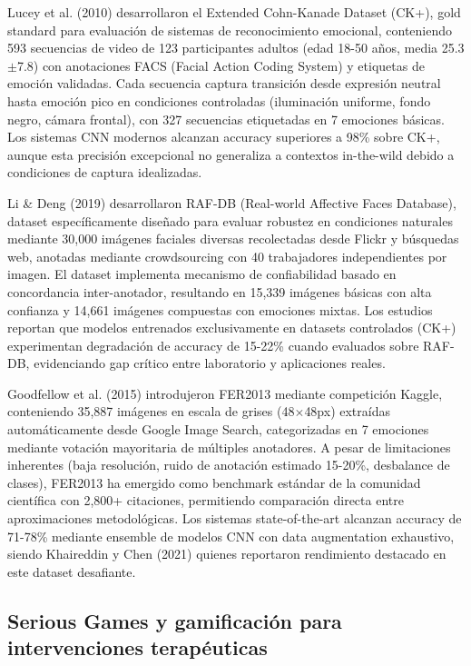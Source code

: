 \documentclass[journal,article,submit,pdftex,moreauthors]{Definitions/mdpi}
\begin{document}
	Lucey et al. (2010) \cite{ref14} desarrollaron el Extended Cohn-Kanade Dataset (CK+), gold standard para evaluación de sistemas de reconocimiento emocional, conteniendo 593 secuencias de video de 123 participantes adultos (edad 18-50 años, media 25.3$\pm$7.8) con anotaciones FACS (Facial Action Coding System) y etiquetas de emoción validadas. Cada secuencia captura transición desde expresión neutral hasta emoción pico en condiciones controladas (iluminación uniforme, fondo negro, cámara frontal), con 327 secuencias etiquetadas en 7 emociones básicas. Los sistemas CNN modernos alcanzan accuracy superiores a 98\% sobre CK+, aunque esta precisión excepcional no generaliza a contextos in-the-wild debido a condiciones de captura idealizadas.
	
	Li \& Deng (2019) \cite{ref15} desarrollaron RAF-DB (Real-world Affective Faces Database), dataset específicamente diseñado para evaluar robustez en condiciones naturales mediante 30,000 imágenes faciales diversas recolectadas desde Flickr y búsquedas web, anotadas mediante crowdsourcing con 40 trabajadores independientes por imagen. El dataset implementa mecanismo de confiabilidad basado en concordancia inter-anotador, resultando en 15,339 imágenes básicas con alta confianza y 14,661 imágenes compuestas con emociones mixtas. Los estudios reportan que modelos entrenados exclusivamente en datasets controlados (CK+) experimentan degradación de accuracy de 15-22\% cuando evaluados sobre RAF-DB, evidenciando gap crítico entre laboratorio y aplicaciones reales.
	
	Goodfellow et al. (2015) \cite{ref16} introdujeron FER2013 mediante competición Kaggle, conteniendo 35,887 imágenes en escala de grises (48$\times$48px) extraídas automáticamente desde Google Image Search, categorizadas en 7 emociones mediante votación mayoritaria de múltiples anotadores. A pesar de limitaciones inherentes (baja resolución, ruido de anotación estimado 15-20\%, desbalance de clases), FER2013 ha emergido como benchmark estándar de la comunidad científica con 2,800+ citaciones, permitiendo comparación directa entre aproximaciones metodológicas. Los sistemas state-of-the-art alcanzan accuracy de 71-78\% mediante ensemble de modelos CNN con data augmentation exhaustivo, siendo Khaireddin y Chen (2021) \cite{ref17} quienes reportaron rendimiento destacado en este dataset desafiante.
	
	\subsection{Serious Games y gamificación para intervenciones terapéuticas}
	
\end{document}
